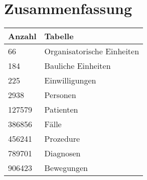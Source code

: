 \section{Zusammenfassung}
\begin{center}
 \begin{longtable}{|p{2.3cm}|p{5cm}|}
  \hline

\rowcolor{lightgray} Anzahl & Tabelle \\ \hline
\endhead
66 & Organisatorische Einheiten \\ \hline
184 & Bauliche Einheiten \\ \hline
225 & Einwilligungen \\ \hline
2938 & Personen \\ \hline
127579 & Patienten \\ \hline
386856 & Fälle \\ \hline
456241 & Prozedure \\ \hline
789701 & Diagnosen \\ \hline
906423 & Bewegungen \\ \hline
\end{longtable}
\end{center}
